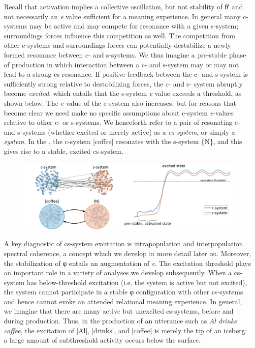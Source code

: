   Recall that activation implies a collective oscillation, but not stability of θ′ and not necessarily an \textit{e} value sufficient for a meaning experience. In general many c-systems may be active and may compete for resonance with a given s-system; surroundings forces influence this competition as well. The competition from other c-systems and surroundings forces can potentially destabilize a newly formed resonance between c- and s-systems. We thus imagine a pre-stable phase of production in which interaction between a c- and s-system may or may not lead to a strong cs-resonance. If positive feedback between the c- and s-system is sufficiently strong relative to destabilizing forces, the c- and s- system abruptly become \textit{excited}, which entails that the s-system \textit{e} value exceeds a threshold, as shown below. The \textit{e}{}-value of the c-system also increases, but for reasons that become clear we need make no specific assumptions about c-system \textit{e}{}-values relative to other c- or s-systems. We henceforth refer to a pair of resonating c- and s-systems (whether excited or merely active) as a \textit{cs-system}, or simply a \textit{system}. In the {\figurebelow}, the c-system [coffee] resonates with the s-system \{N\}, and this gives rise to a stable, excited cs-system.

  
\begin{figure}
\includegraphics[width=\textwidth]{figures/Tilsen-img17.png}
\caption{\missingcaption}
\label{fig:2:10}
\end{figure}
 

  A key diagnostic of cs-system excitation is intrapopulation and interpopulation spectral coherence, a concept which we develop in more detail later on. Moreover, the stabilization of φ entails an augmentation of \textit{e}. The excitation threshold plays an important role in a variety of analyses we develop subsequently. When a cs-system has below-threshold excitation (i.e. the system is active but not excited), the system cannot participate in a stable φ configuration with other cs-systems and hence cannot evoke an attended relational meaning experience. In general, we imagine that there are many active but unexcited cs-systems, before and during production. Thus, in the production of an utterance such as \textit{Al drinks coffee}, the excitation of [Al], [drinks], and [coffee] is merely the tip of an iceberg: a large amount of subthreshold activity occurs below the surface.

